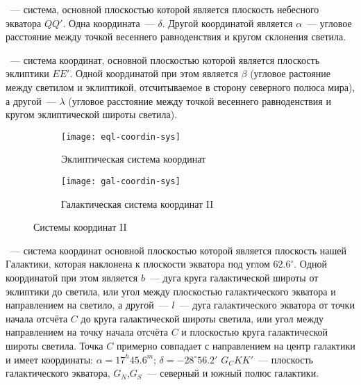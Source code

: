 ~--- система, основной плоскостью которой является плоскость небесного экватора $QQ'$. Одна координата~---  $\delta$. Другой координатой является  $\alpha$~--- угловое расстояние между точкой весеннего равноденствия и кругом склонения светила.


~--- система координат, основной плоскостью которой является плоскость эклиптики $EE'$. Одной координатой при этом является  $\beta$ (угловое растояние между светилом и эклиптикой, отсчитываемое в сторону северного полюса мира), а другой~---  $\lambda$ (угловое расстояние между точкой весеннего равноденствия и кругом эклиптической широты светила).

\begin{figure}[!h]

\centering
	\begin{subfigure}{0.49\textwidth}
		\texttt{[image: eql-coordin-sys]}
		\caption{Эклиптическая система координат}
	 \end{subfigure}
	 \hfill
	\begin{subfigure}{0.49\textwidth}
		\texttt{[image: gal-coordin-sys]}
		\caption{Галактическая система координат II}
	 \end{subfigure}
	\caption{Системы координат II}
\end{figure}

~--- система координат основной плоскостью которой является плоскость нашей Галактики, которая наклонена к плоскости экватора под углом $62.6^{\circ}$. Одной координатой при этом является  $b$~--- дуга круга галактической широты от эклиптики до светила, или угол между плоскостью галактического экватора и направлением на светило, а другой~---  $l$~--- дуга галактического экватора от точки начала отсчёта $C$ до круга галактической широты светила, или угол между направлением на точку начала отсчёта $C$ и плоскостью круга галактической широты светила. Точка $C$ примерно совпадает с направлением на центр галактики и имеет координаты: $\alpha=17^h45.6^m$; $\delta=-28^{\circ}56.2'$ $G_CKK'$~--- плоскость галактического экватора, $G_N$,$G_S$~--- северный и южный полюс галактики.